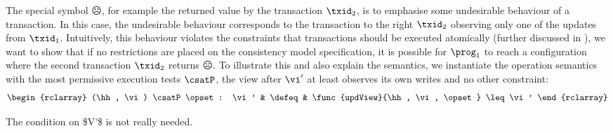 The special symbol \(\sadface\), for example the returned value by the transaction $\txid_2$, is to emphasise some undesirable behaviour of a transaction.
In this case, the undesirable behaviour corresponds to the transaction to the right \( \txid_{2} \) observing only one of the updates from \( \txid_{1} \). 
Intuitively, this behaviour violates the constraints that transactions should be executed atomically (further discussed in ), we want to show that if no restrictions are placed on the consistency model specification, it is possible for $\prog_1$ to reach a configuration where the second transaction $\txid_2$ returns $\sadface$. 
To illustrate this and also explain the semantics, we instantiate the operation semantics with the most permissive execution tests \( \csatP \), \ie the view after \( \vi' \) at least observes its own writes and no other constraint:
\[
\begin{rclarray}
    (\hh, \vi) \csatP \opset : \vi' & \defeq & \func{updView}{\hh, \vi, \opset} \leq \vi'
\end{rclarray}
\]

\ac{The condition on $V'$ is not really needed.}

